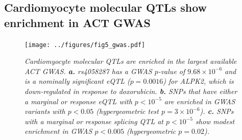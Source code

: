 \documentclass{article}
\begin{document}
\subsection*{Cardiomyocyte molecular QTLs show enrichment in ACT GWAS} 

\begin{figure}
\begin{center}
    \texttt{[image: ../figures/fig5\_gwas.pdf]}     \caption{\it{Cardiomyocyte molecular QTLs are enriched in the largest available ACT GWAS\cite{Schneider2016}. \textbf{a.} rs4058287 has a GWAS $p$-value of $9.68\times 10^{-6}$ and is a nominally significant eQTL ($p=0.0016$) for \emph{ALPK2}, which is down-regulated in response to doxorubicin. \textbf{b.} SNPs that have either a marginal or response eQTL with $p<10^{-5}$ are enriched in GWAS variants with $p<0.05$ (hypergeometric test $p=3 \times 10^{-6}$). \textbf{c.} SNPs with a marginal or response splicing QTL at $p<10^{-5}$ show modest enrichment in GWAS $p<0.005$ (hypergeometric $p=0.02$).}}
    \label{fig:gwas}
    \end{center}
\end{figure}

\end{document}
